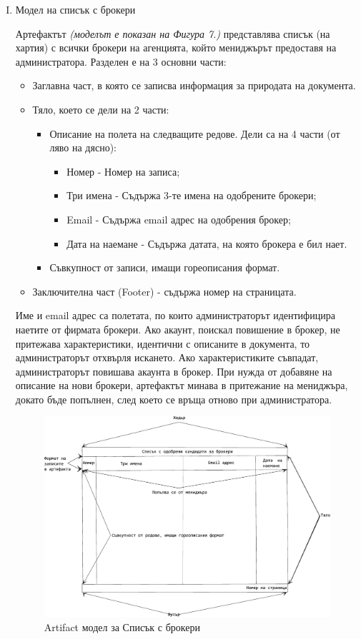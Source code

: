 \documentclass[]{article}
\begin{document}
\begin{enumerate}[I.]
{	}
	
	\item {Модел на списък с брокери

Артефактът \emph{(моделът е показан на Фигура 7.)} представлява списък (на хартия) с всички брокери на агенцията, който мениджърът предоставя на администратора. Разделен е на 3 основни части:
	\begin{itemize}
	\item Заглавна част, в която се записва информация за природата на документа.
	\item {Тяло, което се дели на 2 части:
		\begin{itemize}
		\item {Описание на полета на следващите редове. Дели са на 4 части (от ляво на дясно):
			\begin{itemize}
			\item Номер - Номер на записа;
			\item Три имена - Съдържа 3-те имена на одобрените брокери;
			\item Email - Съдържа email адрес на одобрения брокер;
			\item Дата на наемане - Съдържа датата, на която брокера е бил нает.
			\end{itemize}					
		}
		\item Съвкупност от записи, имащи гореописания формат.
		\end{itemize}
		}
	\item Заключителна част (Footer) - съдържа номер на страницата.
	\end{itemize}		

Име и email адрес са полетата, по които администраторът идентифицира наетите от фирмата брокери. Ако акаунт, поискал повишение в брокер, не притежава характеристики, идентични с описаните в документа, то администраторът отхвърля искането. Ако характеристиките съвпадат, администраторът повишава акаунта в брокер. При нужда от добавяне на описание на нови брокери, артефактът минава в притежание на мениджъра, докато бъде попълнен, след което се връща отново при администратора. 

	\begin{figure}[h]
	\centering
	\includegraphics[scale=0.85]{art-textFile}
	\caption{Artifact модел за Списък с брокери}
	\end{figure}

}
\end{enumerate}
\end{document}
